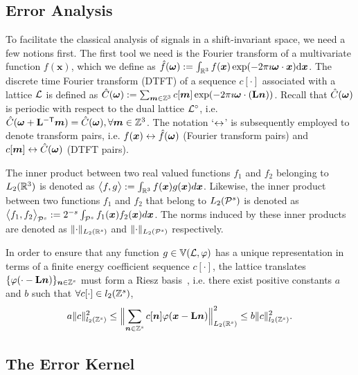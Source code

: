 \subsection{Error Analysis} \label{sec:sis_error}
To facilitate the classical analysis of signals in a shift-invariant space, we need a few notions first. The first tool we need is the Fourier transform of a multivariate function $f(\mathbf{x})$, which we define as $\hat{f}(\boldsymbol{\omega}) := \int_{\mathbb{R}^3} f(\boldsymbol{x}) \exp(-2\pi \imath
\boldsymbol{\omega} \cdot \boldsymbol{x})  \mathrm{d}\boldsymbol{x} $. The discrete time Fourier transform (DTFT) of a sequence $c[\cdot]$ associated with a lattice $\mathcal{L}$ is defined as $\hat{C}(\boldsymbol{\omega}) := \sum_{\boldsymbol{m}  \in \mathbb{Z}^3} c[\boldsymbol{m}] \exp(-2 \pi \imath \boldsymbol{\omega} \cdot
(\mathbf{L}\boldsymbol{n}))$. Recall that $\hat{C}(\boldsymbol{\omega})$ is periodic with respect to the dual lattice $\mathcal{L}^{\circ}$, i.e. $\hat{C}(\boldsymbol{\omega} + {\mathbf{L}}^{\mathsf{-T}} \boldsymbol{m}) = \hat{C}(\boldsymbol{\omega}), \forall \boldsymbol{m} \in \mathbb{Z}^3$. The notation `$\leftrightarrow$' is subsequently employed to denote transform pairs, i.e. $f(\boldsymbol{x}) \leftrightarrow \hat{f}(\boldsymbol{\omega})$ (Fourier transform pairs) and $c[\boldsymbol{m}] \leftrightarrow \hat{C}(\boldsymbol{\omega})$ (DTFT pairs).


The inner product between two real valued functions $f_1$ and $f_2$ belonging to $L_2(\mathbb{R}^3)$ is denoted as $\bigl \langle f , g \bigr \rangle := \int_{\mathbb{R}^3} f(\boldsymbol{x}) g(\boldsymbol{x}) d\boldsymbol{x}$. Likewise, the inner product between two functions $f_1$ and $f_2$ that belong to $L_2(\mathcal{P}^s)$ is denoted as $\bigl \langle f_1 , f_2 \bigr \rangle_{\mathcal{P}^s} := {2^{-s}} \int_{\mathcal{P}^s} f_1(\boldsymbol{x}) f_2(\boldsymbol{x}) d\boldsymbol{x}$. The norms induced by these inner products are denoted as $\lVert \cdot \rVert_{L_2(\mathbb{R}^s)}$ and $\lVert \cdot \rVert_{L_2(\mathcal{P}^s)}$ respectively.


In order to ensure that any function $g \in \mathbb{V}({\mathcal{L}},{\varphi})$ has a unique representation in terms of a finite energy coefficient sequence $c[\cdot]$, the lattice translates $\{\varphi(\cdot - \mathbf{L}\boldsymbol{n})\}_{\boldsymbol{n}  \in \mathbb{Z}^s}$ must form a Riesz basis~\cite{kreyszig89}, i.e. there exist positive constants $a$ and $b$ such that $\forall c[\cdot] \in l_2(\mathbb{Z}^s)$,
\begin{equation*}
  a \lVert c\rVert^2_{l_2(\mathbb{Z}^s)} \le \Bigl\lVert \sum_{\boldsymbol{n} \in \mathbb{Z}^s}
  c[\boldsymbol{n}] \varphi(\boldsymbol{x} - \mathbf{L}\boldsymbol{n}) \Bigr\rVert_{L_2(\mathbb{R}^s)}^2 \le b
	\lVert c\rVert^2_{l_2(\mathbb{Z}^s)}.
\end{equation*}

\subsection{The Error Kernel}

